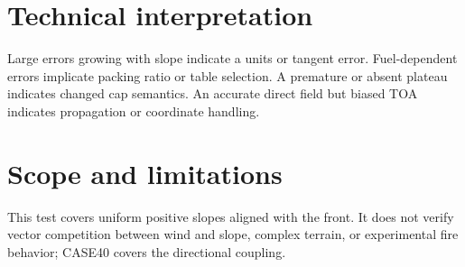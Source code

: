 \section{Technical interpretation}
Large errors growing with slope indicate a units or tangent error.  Fuel-dependent errors implicate packing ratio or table selection.  A premature or absent plateau indicates changed cap semantics.  An accurate direct field but biased TOA indicates propagation or coordinate handling.

\section{Scope and limitations}
This test covers uniform positive slopes aligned with the front.  It does not verify vector competition between wind and slope, complex terrain, or experimental fire behavior; CASE40 covers the directional coupling.

